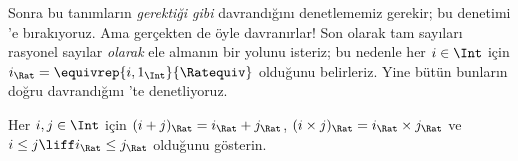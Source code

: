 \documentclass[../../../include/open-logic-section]{subfiles}
\begin{document}
Sonra bu tanımların \emph{gerektiği gibi} davrandığını denetlememiz gerekir;
bu denetimi 'e bırakıyoruz. Ama gerçekten de öyle
davranırlar!{} Son olarak tam sayıları rasyonel sayılar \emph{olarak} ele
almanın bir yolunu isteriz; bu nedenle her $i \in \Int$ için
$i_\Rat = \equivrep{i, 1_\Int}{\Ratequiv}$ olduğunu belirleriz. Yine bütün
bunların doğru davrandığını 'te denetliyoruz.

\begin{prob}
Her $i, j \in \Int$ için $(i + j)_\Rat = i_\Rat+ j_\Rat$,
$(i \times j)_\Rat = i_\Rat \times j_\Rat$ ve
$i \leq j \liff i_\Rat \leq j_\Rat$ olduğunu gösterin.
\end{prob}
\end{document}
